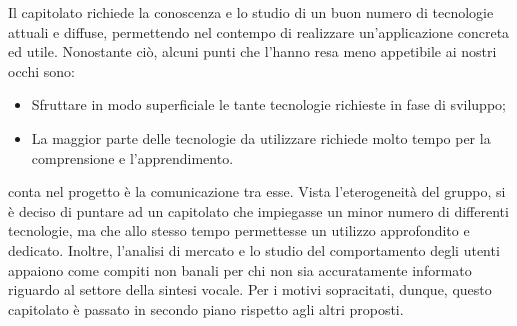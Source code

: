 Il capitolato richiede la conoscenza e lo studio di un buon numero di tecnologie attuali e diffuse, permettendo nel contempo di realizzare un'applicazione concreta ed utile. Nonostante ciò, alcuni punti che l'hanno resa meno appetibile ai nostri occhi sono:
\begin{itemize}
	\item Sfruttare in modo superficiale le tante tecnologie richieste in fase di sviluppo;
	\item La maggior parte delle tecnologie da utilizzare richiede molto tempo per la comprensione e l'apprendimento.
\end{itemize}
conta nel progetto è la comunicazione tra esse. Vista l'eterogeneità
del gruppo, si è deciso di puntare ad un capitolato che impiegasse un minor numero di differenti tecnologie, ma che allo stesso tempo permettesse un utilizzo approfondito e dedicato. Inoltre, l'analisi di mercato e lo studio del comportamento
degli utenti appaiono come compiti non banali per chi non sia accuratamente
informato riguardo al settore della sintesi vocale. Per i motivi sopracitati, dunque, questo capitolato è passato in secondo piano rispetto agli altri proposti.